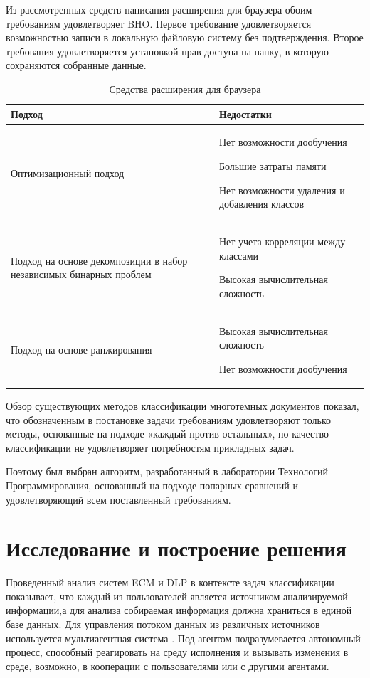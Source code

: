 \documentclass[russian, utf8, emptystyle]{eskdtext}
\begin{document}
Из рассмотренных средств написания расширения для браузера обоим требованиям удовлетворяет BHO. Первое требование удовлетворяется возможностью записи в локальную файловую систему без подтверждения. Второе требования удовлетворяется установкой прав доступа на папку, в которую сохраняются собранные данные.
\begin{table} [h]
	\caption{Средства расширения для браузера}
	\label{tab:far}
	\begin{center}
		\begin{tabular}{|L{8cm}|L{8cm}|}
			\hline
			Подход & Недостатки\\
			\hline     
			Оптимизационный подход & Нет возможности дообучения
			
			Большие затраты памяти
			
			Нет возможности удаления и добавления классов\\
			\hline
			Подход на основе декомпозиции в набор независимых бинарных проблем & Нет учета корреляции между классами
			
			Высокая вычислительная сложность\\
			\hline
			Подход на основе ранжирования  & Высокая вычислительная сложность
			
			Нет возможности дообучения
			\\
			
			\hline
		\end{tabular}
	\end{center}
\end{table}

Обзор существующих методов классификации многотемных документов показал, что обозначенным в постановке задачи требованиям удовлетворяют только методы, основанные на подходе «каждый-против-остальных», но качество классификации не удовлетворяет потребностям прикладных задач. 

Поэтому был выбран алгоритм, разработанный в лаборатории Технологий Программирования, основанный на подходе попарных сравнений и удовлетворяющий всем поставленный требованиям.


\section {Исследование и построение решения}
Проведенный анализ систем ECM и DLP  в контексте задач классификации показывает, что каждый из пользователей является источником анализируемой информации,а для анализа собираемая информация должна храниться в единой базе данных. Для управления потоком данных из различных источников используется мультиагентная система \cite{tan}. Под агентом подразумевается  автономный процесс, способный реагировать на среду исполнения и вызывать изменения в среде, возможно, в кооперации с пользователями или с другими агентами.\\
\end{document}
